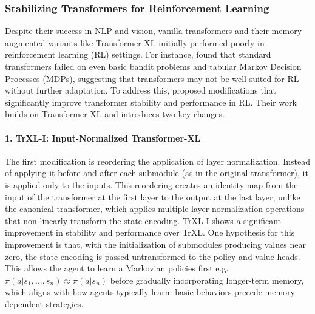 \subsubsection{Stabilizing Transformers for Reinforcement Learning}
Despite their success in NLP and vision, vanilla transformers and their memory-augmented variants 
like Transformer-XL initially performed poorly in reinforcement learning (RL) settings. For instance, 
\cite{mishra2018simpleneuralattentivemetalearner} found that standard transformers failed on even basic 
bandit problems and tabular Markov Decision Processes (MDPs), suggesting that transformers may not be 
well-suited for RL without further adaptation.\newline 
To address this, \cite{parisotto2019stabilizingtransformersreinforcementlearning} proposed modifications that significantly 
improve transformer stability and performance in RL. Their work builds on Transformer-XL and introduces two key changes.

\paragraph{1. TrXL-I: Input-Normalized Transformer-XL} The first modification is reordering the application of layer 
normalization. Instead of applying it before and after each submodule (as in the original transformer), it is applied only to 
the inputs. This reordering creates an identity map from the input of the transformer at the first layer to the output at the 
last layer, unlike the canonical transformer, which applies multiple layer normalization operations that non-linearly 
transform the state encoding.\newline
TrXL-I shows a significant improvement in stability and performance over TrXL. One 
hypothesis for this improvement is that, with the initialization of submodules producing 
values near zero, the state encoding is passed untransformed to the policy and value 
heads. This allows the agent to learn a Markovian policies first e.g. 
$\pi(a | s_1, ..., s_n) \approx \pi(a | s_n)$ before gradually incorporating longer-term memory, 
which aligns with how agents typically learn: basic behaviors precede memory-dependent 
strategies.\cite{parisotto2019stabilizingtransformersreinforcementlearning}

